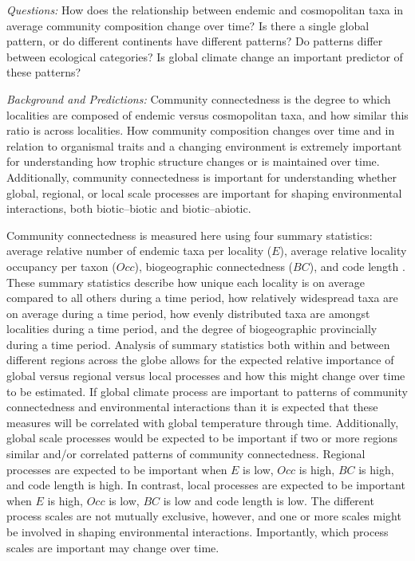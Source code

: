 \documentclass[12pt,letterpaper]{article}
\begin{document}
\textit{Questions:} 
How does the relationship between endemic and cosmopolitan taxa in average community composition change over time? Is there a single global pattern, or do different continents have different patterns? Do patterns differ between ecological categories? Is global climate change an important predictor of these patterns?

\textit{Background and Predictions:}
Community connectedness is the degree to which localities are composed of endemic versus cosmopolitan taxa, and how similar this ratio is across localities. How community composition changes over time and in relation to organismal traits and a changing environment is extremely important for understanding how trophic structure changes or is maintained over time. Additionally, community connectedness is important for understanding whether global, regional, or local scale processes are important for shaping environmental interactions, both biotic--biotic and biotic--abiotic.

Community connectedness is measured here using four summary statistics: average relative number of endemic taxa per locality (\(E\)), average relative locality occupancy per taxon (\(Occ\)), biogeographic connectedness (\(BC\)), and code length \citep{Sidor2013}. These summary statistics describe how unique each locality is on average compared to all others during a time period, how relatively widespread taxa are on average during a time period, how evenly distributed taxa are amongst localities during a time period, and the degree of biogeographic provincially during a time period. Analysis of summary statistics both within and between different regions across the globe allows for the expected relative importance of global versus regional versus local processes and how this might change over time to be estimated. If global climate process are important to patterns of community connectedness and environmental interactions than it is expected that these measures will be correlated with global temperature through time. Additionally, global scale processes would be expected to be important if two or more regions similar and/or correlated patterns of community connectedness. Regional processes are expected to be important when \(E\) is low, \(Occ\) is high, \(BC\) is high, and code length is high. In contrast, local processes are expected to be important when \(E\) is high, \(Occ\) is low, \(BC\) is low and code length is low. The different process scales are not mutually exclusive, however, and one or more scales might be involved in shaping environmental interactions. Importantly, which process scales are important may change over time.
\end{document}
